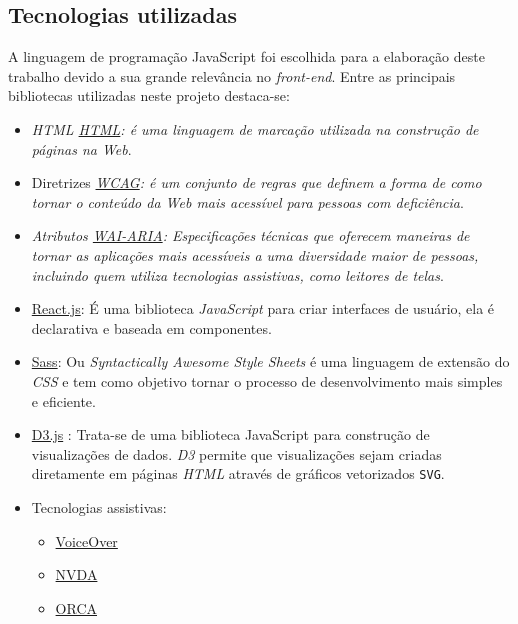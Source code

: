 \subsection{Tecnologias utilizadas} 
{A linguagem de programação JavaScript foi escolhida para a elaboração deste trabalho devido a sua grande relevância no \textit{front-end}. Entre as principais bibliotecas utilizadas neste projeto destaca-se:
\begin{itemize}
\item \textit{HTML \href{https://developer.mozilla.org/pt-BR/docs/Web/HTML}{HTML}: é uma linguagem de marcação utilizada na construção de páginas na \textit{Web}}.
\item Diretrizes \textit{\href{https://www.w3c.br/traducoes/wcag/wcag21-pt-BR/}{WCAG}: é um conjunto de regras que definem a forma de como tornar o conteúdo da \textit{Web} mais acessível para pessoas com deficiência}.
\item \textit{Atributos \href{https://www.w3.org/TR/wai-aria-1.2/}{WAI-ARIA}: Especificações técnicas que oferecem maneiras de tornar as aplicações mais acessíveis a uma diversidade maior de pessoas, incluindo quem utiliza tecnologias assistivas, como leitores de telas}.
\item { \href{https://pt-br.reactjs.org/}{React.js}: É uma biblioteca \textit{JavaScript} para criar interfaces de usuário, ela é declarativa e baseada em componentes}.
\item {\href{https://sass-lang.com/}{Sass}: Ou \textit{Syntactically Awesome Style Sheets} é uma linguagem de extensão do \textit{\textit{CSS}} e tem como objetivo tornar o processo de desenvolvimento mais simples e eficiente}.
\item {\href{https://d3js.org/}{D3.js} : Trata-se de uma biblioteca {JavaScript} para construção de visualizações de dados. \textit{D3} permite que visualizações sejam criadas diretamente em páginas \textit{HTML} \cite{HTML} através de gráficos vetorizados \lstinline{SVG}}.
\item Tecnologias assistivas:
\begin{itemize}
\item \href{https://www.apple.com/br/accessibility/vision/}{VoiceOver}
\item \href{https://www.nvaccess.org/download/}{NVDA}
\item \href{https://help.gnome.org/users/orca/stable/index.html.pt_BR}{ORCA}
\end{itemize}
\end{itemize}
 }
 
